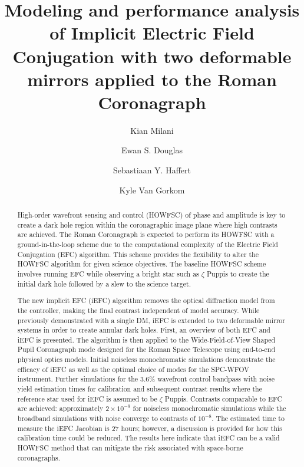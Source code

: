 \documentclass[12pt]{spieman}  %
\title{Modeling and performance analysis of Implicit Electric Field Conjugation with two deformable mirrors applied to the Roman Coronagraph}
\author[a]{Kian Milani}
\author[b]{Ewan S. Douglas}
\author[b]{Sebastiaan Y. Haffert}
\author[b]{Kyle Van Gorkom}
\affil[a]{University of Arizona, Wyant College of Optical Sciences, Tucson, Arizona, United States}
\affil[b]{University of Arizona, Steward Observatory, Tucson, Arizona, United States}
\begin{document}
 
\maketitle

\begin{abstract}
High-order wavefront sensing and control (HOWFSC) of phase and amplitude is key to create a dark hole region within the coronagraphic image plane where high contrasts are achieved. The Roman Coronagraph is expected to perform its HOWFSC with a ground-in-the-loop scheme due to the computational complexity of the Electric Field Conjugation (EFC) algorithm. This scheme provides the flexibility to alter the HOWFSC algorithm for given science objectives. The baseline HOWFSC scheme involves running EFC while observing a bright star such as $\zeta$ Puppis to create the initial dark hole followed by a slew to the science target.

The new implicit EFC (iEFC) algorithm removes the optical diffraction model from the controller, making the final contrast independent of model accuracy. While previously demonstrated with a single DM, iEFC is extended to two deformable mirror systems in order to create annular dark holes. First, an overview of both EFC and iEFC is presented. The algorithm is then applied to the Wide-Field-of-View Shaped Pupil Coronagraph mode designed for the Roman Space Telescope using end-to-end physical optics models. Initial noiseless monochromatic simulations demonstrate the efficacy of iEFC as well as the optimal choice of modes for the SPC-WFOV instrument. Further simulations for the 3.6\% wavefront control bandpass with noise yield estimation times for calibration and subsequent contrast results where the reference star used for iEFC is assumed to be $\zeta$ Puppis. Contrasts comparable to EFC are achieved: approximately $2\times10^{-9}$ for noiseless monochromatic simulations while the broadband simulations with noise converge to contrasts of $10^{-8}$. The estimated time to measure the iEFC Jacobian is 27 hours; however, a discussion is provided for how this calibration time could be reduced. The results here indicate that iEFC can be a valid HOWFSC method that can mitigate the risk associated with space-borne coronagraphs.


\end{abstract}
\end{document}
